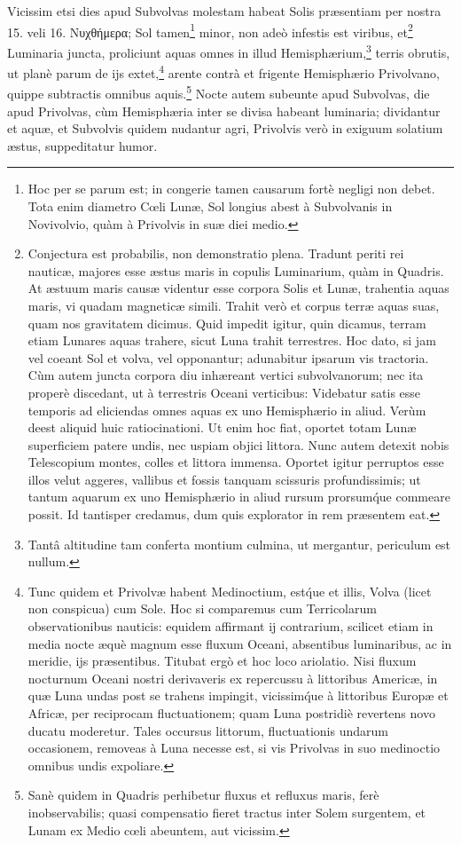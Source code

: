\documentclass[a4paper, 11pt, oneside, polutonikogreek, german]{article}
\begin{document}
Vicissim etsi dies apud Subvolvas molestam habeat Solis præsentiam per nostra 15. veli 16. Νυχθήμερα; Sol tamen\footnote{Hoc per se parum est; in congerie tamen causarum fortè negligi non debet. Tota enim diametro Cœli Lunæ, Sol longius abest à Subvolvanis in Novivolvio, quàm à Privolvis in suæ diei medio.} minor, non adeò infestis est viribus, et\footnote{Conjectura est probabilis, non demonstratio plena. Tradunt periti rei nauticæ, majores esse æstus maris in copulis Luminarium, quàm in Quadris. At æstuum maris causæ videntur esse corpora Solis et Lunæ, trahentia aquas maris, vi quadam magneticæ simili. Trahit verò et corpus terræ aquas suas, quam nos gravitatem dicimus. Quid impedit igitur, quin dicamus, terram etiam Lunares aquas trahere, sicut Luna trahit terrestres. Hoc dato, si jam vel coeant Sol et volva, vel opponantur; adunabitur ipsarum vis tractoria. Cùm autem juncta corpora diu inhæreant vertici subvolvanorum; nec ita properè discedant, ut à terrestris Oceani verticibus: Videbatur satis esse temporis ad eliciendas omnes aquas ex uno Hemisphærio in aliud. Verùm deest aliquid huic ratiocinationi. Ut enim hoc fiat, oportet totam Lunæ superficiem patere undis, nec uspiam objici littora. Nunc autem detexit nobis Telescopium montes, colles et littora immensa. Oportet igitur perruptos esse illos velut aggeres, vallibus et fossis tanquam scissuris profundissimis; ut tantum aquarum ex uno Hemisphærio in aliud rursum prorsum\'que commeare possit. Id tantisper credamus, dum quis explorator in rem præsentem eat.} Luminaria juncta, proliciunt aquas omnes in illud Hemisphærium,\footnote{Tantâ altitudine tam conferta montium culmina, ut mergantur, periculum est nullum.} terris obrutis, ut planè parum de ijs extet,\footnote{Tunc quidem et Privolvæ habent Medinoctium, est\'que et illis, Volva (licet non conspicua) cum Sole. Hoc si comparemus cum Terricolarum observationibus nauticis: equidem affirmant ij contrarium, scilicet etiam in media nocte æquè magnum esse fluxum Oceani, absentibus luminaribus, ac in meridie, ijs præsentibus. Titubat ergò et hoc loco ariolatio. Nisi fluxum nocturnum Oceani nostri derivaveris ex repercussu à littoribus Americæ, in quæ Luna undas post se trahens impingit, vicissim\'que à littoribus Europæ et Africæ, per reciprocam fluctuationem; quam Luna postridiè revertens novo ducatu moderetur. Tales occursus littorum, fluctuationis undarum occasionem, removeas à Luna necesse est, si vis Privolvas in suo medinoctio omnibus undis expoliare.} arente contrà et frigente Hemisphærio Privolvano, quippe subtractis omnibus aquis.\footnote{Sanè quidem in Quadris perhibetur fluxus et refluxus maris, ferè inobservabilis; quasi compensatio fieret tractus inter Solem surgentem, et Lunam ex Medio cœli abeuntem, aut vicissim.} Nocte autem subeunte apud Subvolvas, die apud Privolvas, cùm Hemisphæria inter se divisa habeant luminaria; dividantur et aquæ, et Subvolvis quidem nudantur agri, Privolvis verò in exiguum solatium æstus, suppeditatur humor.
\end{document}
